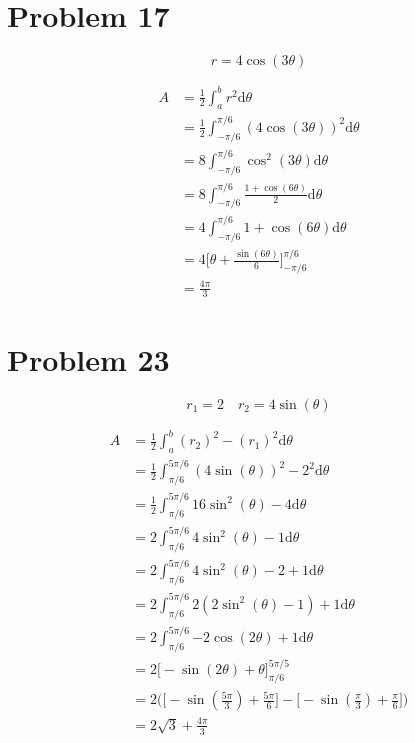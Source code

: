 \documentclass[letterpaper, 12pt]{article}
\newcommand*{\diff}{\mathrm{d}}
\begin{document}
\section*{Problem 17}
\[ r = 4\cos(3\theta) \]
\begin{center}
\end{center}
\begin{align*}
  A &= \frac{1}{2}\int_{a}^{b}{r^{2}\diff{\theta}} \\
  &= \frac{1}{2}\int_{-\pi/6}^{\pi/6}{(4\cos(3\theta))^{2}\diff{\theta}} \\
  &= 8\int_{-\pi/6}^{\pi/6}{\cos^{2}(3\theta)\diff{\theta}} \\
  &= 8\int_{-\pi/6}^{\pi/6}{\frac{1+\cos(6\theta)}{2}\diff{\theta}} \\
  &= 4\int_{-\pi/6}^{\pi/6}{1+\cos(6\theta)\diff{\theta}} \\
  &= 4\bigg[\theta+\frac{\sin(6\theta)}{6}]_{-\pi/6}^{\pi/6} \\
  &= \frac{4\pi}{3}
\end{align*}

\section*{Problem 23}
\[ r_{1} = 2 \quad r_{2} = 4\sin(\theta) \]
\begin{center}
\end{center}
\begin{align*}
  A &= \frac{1}{2}\int_{a}^{b}{(r_{2})^{2}-(r_{1})^{2}\diff{\theta}} \\
  &= \frac{1}{2}\int_{\pi/6}^{5\pi/6}{(4\sin(\theta))^{2}-2^{2}\diff{\theta}} \\
  &= \frac{1}{2}\int_{\pi/6}^{5\pi/6}{16\sin^{2}(\theta)-4\diff{\theta}} \\
  &= 2\int_{\pi/6}^{5\pi/6}{4\sin^{2}(\theta)-1\diff{\theta}} \\
  &= 2\int_{\pi/6}^{5\pi/6}{4\sin^{2}(\theta)-2+1\diff{\theta}} \\
  &= 2\int_{\pi/6}^{5\pi/6}{2(2\sin^{2}(\theta)-1)+1\diff{\theta}} \\
  &= 2\int_{\pi/6}^{5\pi/6}{-2\cos(2\theta)+1\diff{\theta}} \\
  &= 2\bigg[-\sin(2\theta)+\theta\bigg]_{\pi/6}^{5\pi/5} \\
  &= 2\bigg(\big[-\sin(\frac{5\pi}{3})+\frac{5\pi}{6}\big]-
    \big[-\sin(\frac{\pi}{3})+\frac{\pi}{6}\big]\bigg) \\
  &= 2\sqrt{3}+\frac{4\pi}{3}
\end{align*}
\end{document}
